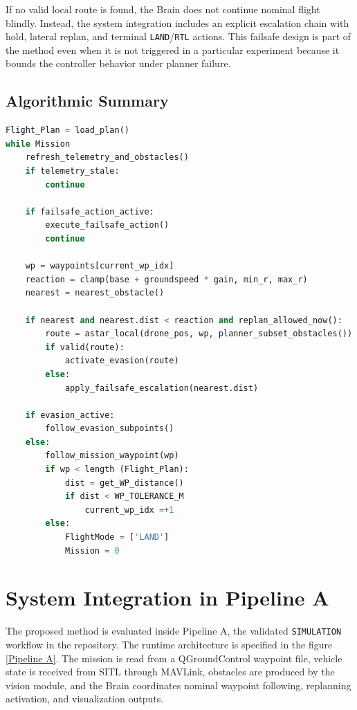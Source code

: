 \documentclass[a4paper,11pt]{article}
\begin{document}
If no valid local route is found, the Brain does not continue nominal flight blindly. Instead, the system integration includes an explicit escalation chain with hold, lateral replan, and terminal \texttt{LAND}/\texttt{RTL} actions. This failsafe design is part of the method even when it is not triggered in a particular experiment because it bounds the controller behavior under planner failure.

\subsection{Algorithmic Summary}

\begin{lstlisting}[language=Python, caption=Simplified control loop for the proposed method]
Flight_Plan = load_plan()
while Mission
    refresh_telemetry_and_obstacles()
    if telemetry_stale:
        continue

    if failsafe_action_active:
        execute_failsafe_action()
        continue

    wp = waypoints[current_wp_idx]
    reaction = clamp(base + groundspeed * gain, min_r, max_r)
    nearest = nearest_obstacle()

    if nearest and nearest.dist < reaction and replan_allowed_now():
        route = astar_local(drone_pos, wp, planner_subset_obstacles())
        if valid(route):
            activate_evasion(route)
        else:
            apply_failsafe_escalation(nearest.dist)

    if evasion_active:
        follow_evasion_subpoints()
    else:
        follow_mission_waypoint(wp)
        if wp < length (Flight_Plan): 
            dist = get_WP_distance()
            if dist < WP_TOLERANCE_M
                current_wp_idx =+1
        else: 
            FlightMode = ['LAND']
            Mission = 0

\end{lstlisting}

\section{System Integration in Pipeline A}

The proposed method is evaluated inside Pipeline A, the validated \texttt{SIMULATION} workflow in the repository. The runtime architecture is specified in the figure \ref{Pipeline A}. The mission is read from a QGroundControl waypoint file, vehicle state is received from SITL through MAVLink, obstacles are produced by the vision module, and the Brain coordinates nominal waypoint following, replanning activation, and visualization outputs.
\end{document}
